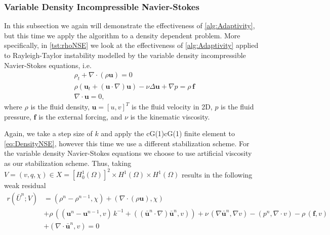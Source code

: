 \subsubsection{Variable Density Incompressible Navier-Stokes}
In this subsection we again will demonstrate the effectiveness of
\autoref{alg:Adaptivity}, but this time we apply the algorithm to a density
dependent problem. More specifically, in \autoref{tst:rhoNSE} we look at the
effectiveness of \autoref{alg:Adaptivity} applied to Rayleigh-Taylor instability
modelled by the variable density incompressible Navier-Stokes equations, i.e.
\begin{equation}
    \begin{split}
        &\rho_t + \nabla \cdot \left( \rho \mathbf{u} \right) = 0 \\
        &\rho \left( \mathbf{u}_t
            + \left( \mathbf{u}\cdot \nabla \right) \mathbf{u} \right)
            - \nu \Delta \mathbf{u} + \nabla p = \rho\, \mathbf{f} \\
        &\nabla \cdot \mathbf{u} = 0,
    \end{split}
    \label{eq:DensityNSE}
\end{equation}
where $\rho$ is the fluid density, $\mathbf{u} = \left[ u, v \right]^T$ is the
fluid velocity in 2D, $p$ is the fluid pressure, $\mathbf{f}$ is the
external forcing, and $\nu$ is the kinematic viscosity.

Again, we take a step size of $k$ and apply the cG(1)cG(1) finite
element to \autoref{eq:DensityNSE}, however this time we use a different
stabilization scheme. For the variable density Navier-Stokes equations we
choose to use artificial viscosity as our stabilization scheme. Thus, taking
$V = (v, q, \chi) \in X = \left[ H^1_0(\Omega) \right]^2 \times H^1(\Omega)
\times H^1(\Omega)$ results in the following weak residual
\begin{equation}
    \begin{split}
        r(\bar{U}^n; V) &= (\rho^n - \rho^{n-1}, \chi) + (\nabla \cdot \left(
            \rho \mathbf{u} \right), \chi) \\
        &+  \rho\, \left(\left(\mathbf{u}^n
                - \mathbf{u}^{n-1}, v\right)\,k^{-1}
            + (\left( \bar{\mathbf{u}}^n \cdot \nabla \right)
                \bar{\mathbf{u}}^n, v)\right)
            + \nu\, (\nabla \bar{\mathbf{u}}^n, \nabla v)
            - (p^n, \nabla \cdot v) - \rho\, (\mathbf{f}, v) \\
        &+ (\nabla \cdot \bar{\mathbf{u}}^n, v) = 0
    \end{split}
    \label{eq:WeakRhoNSE}
\end{equation}

\begin{test} \label{tst:rhoNSE}
\end{test}
